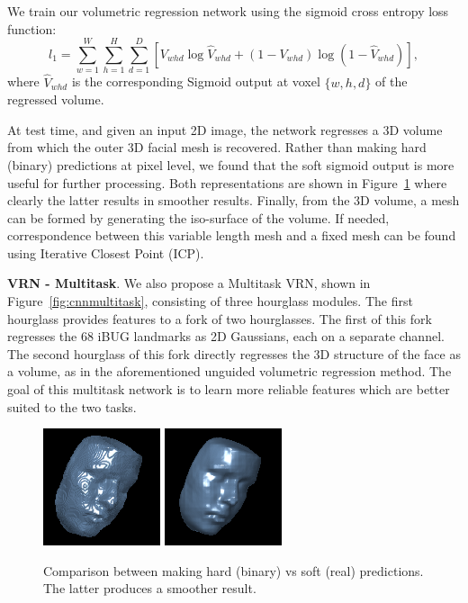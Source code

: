 We train our volumetric regression network using the sigmoid cross
entropy loss function:
\begin{equation} l_{1} = \sum\limits_{w=1}^{W}
  \sum\limits_{h=1}^{H}\sum\limits_{d=1}^{D}[V_{whd}\log
  \widehat{V}_{whd}+(1-V_{whd})\log(1-\widehat{V}_{whd})],
\end{equation} where $\widehat{V}_{whd}$ is the corresponding Sigmoid
output at voxel $\{w,h,d\}$ of the regressed volume.

At test time, and given an input 2D image, the network regresses a 3D
volume from which the outer 3D facial mesh is recovered. Rather than
making hard (binary) predictions at pixel level, we found that the
soft sigmoid output is more useful for further processing. Both
representations are shown in Figure~\ref{fig:roughvssmooth} where
clearly the latter results in smoother results. Finally, from the 3D
volume, a mesh can be formed by generating the iso-surface of the
volume. If needed, correspondence between this variable length mesh
and a fixed mesh can be found using Iterative Closest Point (ICP).

\textbf{VRN - Multitask}. We also propose a Multitask VRN, shown in
Figure~\ref{fig:cnnmultitask}, consisting of three hourglass
modules. The first hourglass provides features to a fork of two
hourglasses. The first of this fork regresses the 68 iBUG landmarks
\cite{sagonas2013semi} as 2D Gaussians, each on a separate
channel. The second hourglass of this fork directly regresses the 3D
structure of the face as a volume, as in the aforementioned unguided
volumetric regression method. The goal of this multitask network is to
learn more reliable features which are better suited to the two tasks.


\begin{figure}
  \centering
  \includegraphics[width=0.2\linewidth]{img/example_rough.png}
  \includegraphics[width=0.2\linewidth]{img/example_smooth.png}
  \caption[Binary vs Real volumes]{Comparison between making hard
    (binary) vs soft (real) predictions. The latter produces a
    smoother result.}
  \label{fig:roughvssmooth}
  \vspace{-4mm}
\end{figure}



